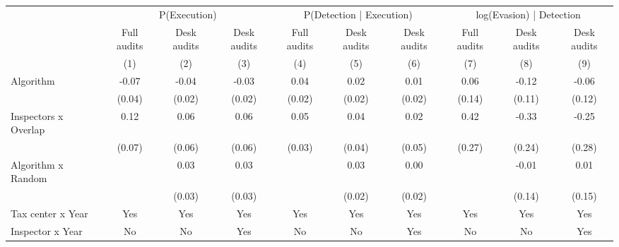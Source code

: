 \begin{tabular}{lccc|ccc|ccc} \toprule
\multicolumn{1}{l}{} & \multicolumn{3}{c}{P(Execution)} & \multicolumn{3}{c}{P(Detection | Execution)} & \multicolumn{3}{c}{log(Evasion) | Detection} \\\cmidrule(lr){2-4}\cmidrule(lr){5-7}\cmidrule(lr){8-10} \multicolumn{1}{l}{} & Full audits & Desk audits & Desk audits & Full audits & Desk audits & Desk audits & Full audits & Desk audits & Desk audits \\ \multicolumn{1}{l}{} & (1) & (2) & (3) & (4) & (5) & (6) & (7) & (8) & (9) \\ \midrule
Algorithm   &       -0.07\sym{*}  &       -0.04         &       -0.03         &        0.04\sym{**} &        0.02         &        0.01         &        0.06         &       -0.12         &       -0.06         \\
            &      (0.04)         &      (0.02)         &      (0.02)         &      (0.02)         &      (0.02)         &      (0.02)         &      (0.14)         &      (0.11)         &      (0.12)         \\
\addlinespace
Inspectors x Overlap&        0.12\sym{*}  &        0.06         &        0.06         &        0.05         &        0.04         &        0.02         &        0.42         &       -0.33         &       -0.25         \\
            &      (0.07)         &      (0.06)         &      (0.06)         &      (0.03)         &      (0.04)         &      (0.05)         &      (0.27)         &      (0.24)         &      (0.28)         \\
\addlinespace
Algorithm x Random&                     &        0.03         &        0.03         &                     &        0.03         &        0.00         &                     &       -0.01         &        0.01         \\
            &                     &      (0.03)         &      (0.03)         &                     &      (0.02)         &      (0.02)         &                     &      (0.14)         &      (0.15)         \\
\midrule
Tax center x Year&         Yes         &         Yes         &         Yes         &         Yes         &         Yes         &         Yes         &         Yes         &         Yes         &         Yes         \\
Inspector x Year&          No         &          No         &         Yes         &          No         &          No         &         Yes         &          No         &          No         &         Yes         \\

\end{tabular}
